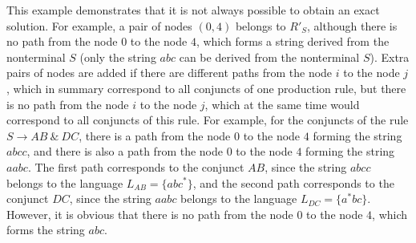This example demonstrates that it is not always possible to obtain an exact solution. For example, a pair of nodes $(0,4)$ belongs to $R'_S$, although there is no path from the node $0$ to the node $4$, which forms a string derived from the nonterminal $S$ (only the string $abc$ can be derived from the nonterminal $S$). Extra pairs of nodes are added if there are different paths from the node $i$ to the node $j$, which in summary correspond to all conjuncts of one production rule, but there is no path from the node $i$ to the node $j$, which at the same time would correspond to all conjuncts of this rule. For example, for the conjuncts of the rule $S \rightarrow AB \ \& \ DC$, there is a path from the node $0$ to the node $4$ forming the string $abcc$, and there is also a path from the node $0$ to the node $4$ forming the string $aabc$. The first path corresponds to the conjunct $AB$, since the string $abcc$ belongs to the language $L_{AB} = \{abc^*\}$, and the second path corresponds to the conjunct $DC$, since the string $aabc$ belongs to the language $L_{DC} = \{a^*bc\}$. However, it is obvious that there is no path from the node $0$ to the node $4$, which forms the string $abc$.
